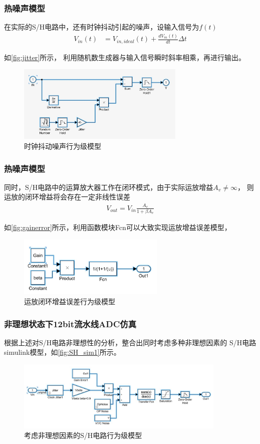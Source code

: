 \documentclass[10pt, mathserif]{beamer}	%
\newcommand{\ftitle}[1]{\frametitle{#1}}	%
\begin{document}
	\begin{frame}
		\ftitle{热噪声模型}
		在实际的S/H电路中，还有时钟抖动引起的噪声，设输入信号为$ f(t) $
		\begin{align}
			V_{in}(t) & = V_{in,ideal}(t) + \frac{dV_{in}(t)}{dt}\Delta t 
		\end{align}

		如\autoref{fig:jitter}所示，
		利用随机数生成器与输入信号瞬时斜率相乘，再进行输出。
		\begin{figure}[H]
			\centering
			\includegraphics[width=8cm]{jitter}
			\caption{\label{fig:jitter}时钟抖动噪声行为级模型}
		\end{figure}
	\end{frame}

	\begin{frame}
		\ftitle{热噪声模型}
		\par 同时，S/H电路中的运算放大器工作在闭环模式，由于实际运放增益$ A_v \neq \infty $，
		则运放的闭环增益将会存在一定非线性误差
		\begin{align}
			V_{out} = V_{in}\frac{A_v}{1+\beta A_v}
		\end{align}
		\par 如\autoref{fig:gainerror}所示，利用函数模块Fcn可以大致实现运放增益误差模型，
		\begin{figure}[H]
			\centering
			\includegraphics[width=7cm]{gainerror}
			\caption{\label{fig:gainerror}运放闭环增益误差行为级模型}
		\end{figure}
	
	\end{frame}


	\begin{frame}
		\ftitle{非理想状态下12bit流水线ADC仿真}
		根据上述对S/H电路非理想性的分析，整合出同时考虑多种非理想因素的
		S/H电路simulink模型，如\autoref{fig:SH_sim1}所示。
		\begin{figure}[H]
			\centering
			\includegraphics[width=10cm]{SH_sim1}
			\caption{\label{fig:SH_sim1}考虑非理想因素的S/H电路行为级模型}
		\end{figure}		
	\end{frame}
\end{document}
